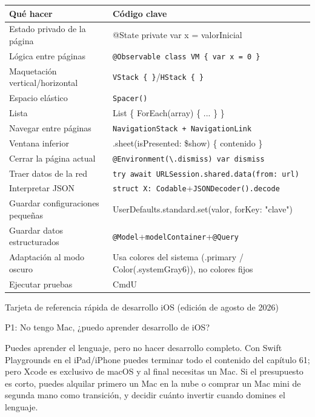 


\begin{center}
\begin{tabularx}{\linewidth}{|X|X|}
\hline
\textbf{Qué hacer} & \textbf{Código clave} \tabularnewline
\hline
Estado privado de la página & @State private var x = valorInicial \tabularnewline
Lógica entre páginas & \texttt{@Observable class VM \{ var x = 0 \}} \tabularnewline
Maquetación vertical/horizontal & \texttt{VStack \{ \}}/\texttt{HStack \{ \}} \tabularnewline
Espacio elástico & \texttt{Spacer()} \tabularnewline
Lista & List \{ ForEach(array) \{ ... \} \} \tabularnewline
Navegar entre páginas & \texttt{NavigationStack + NavigationLink} \tabularnewline
Ventana inferior & .sheet(isPresented: \$show) \{ contenido \} \tabularnewline
Cerrar la página actual & \texttt{@Environment(\textbackslash{}.\allowbreak dismiss) var dismiss} \tabularnewline
Traer datos de la red & \texttt{try await URLSession.\allowbreak shared.\allowbreak data(from: url)} \tabularnewline
Interpretar JSON & \texttt{struct X: Codable}+\texttt{JSONDecoder().\allowbreak decode} \tabularnewline
Guardar configuraciones pequeñas & UserDefaults.standard.set(valor, forKey: "clave") \tabularnewline
Guardar datos estructurados & \texttt{@Model}+\texttt{modelContainer}+\texttt{@Query} \tabularnewline
Adaptación al modo oscuro & Usa colores del sistema (.primary / Color(.systemGray6)), no colores fijos \tabularnewline
Ejecutar pruebas & CmdU \tabularnewline
\hline
\end{tabularx}
\end{center}

\begin{center}\small\color{gray}Tarjeta de referencia rápida de desarrollo iOS (edición de agosto de 2026)\end{center}


P1: No tengo Mac, ¿puedo aprender desarrollo de iOS?

Puedes aprender el lenguaje, pero no hacer desarrollo completo. Con Swift Playgrounds en el iPad/iPhone puedes terminar todo el contenido del capítulo 61; pero Xcode es exclusivo de macOS y al final necesitas un Mac. Si el presupuesto es corto, puedes alquilar primero un Mac en la nube o comprar un Mac mini de segunda mano como transición, y decidir cuánto invertir cuando domines el lenguaje.

